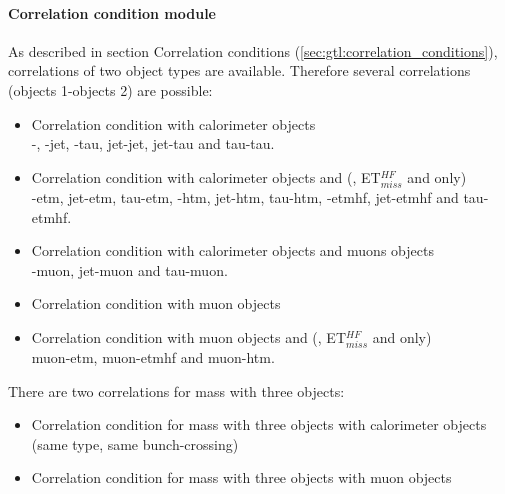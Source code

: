 \paragraph{Correlation condition module}
\label{sec:gtl:correlation_condition_modules}

As described in section Correlation conditions (\ref{sec:gtl:correlation_conditions}), correlations of two object types are available. Therefore several correlations (objects 1-objects 2) are possible:
\begin{itemize}
\item Correlation condition with calorimeter objects\\
\egamma-\egamma, \egamma-jet, \egamma-tau, jet-jet, jet-tau and tau-tau.
\item Correlation condition with calorimeter objects and \esums (\etm, ET$_{miss}^{HF}$ and \htm only)\\
\egamma-etm, jet-etm, tau-etm, \egamma-htm, jet-htm, tau-htm, \egamma-etmhf, jet-etmhf and tau-etmhf.
\item Correlation condition with calorimeter objects and muons objects\\
\egamma-muon, jet-muon and tau-muon.
\item Correlation condition with muon objects\\
\item Correlation condition with muon objects and \esums (\etm, ET$_{miss}^{HF}$ and \htm only)\\
muon-etm, muon-etmhf and muon-htm.
\end{itemize}

There are two correlations for mass with three objects:
\begin{itemize}
\item Correlation condition for mass with three objects with calorimeter objects (same type, same bunch-crossing)\\
\item Correlation condition for mass with three objects with muon objects\\
\end{itemize}

